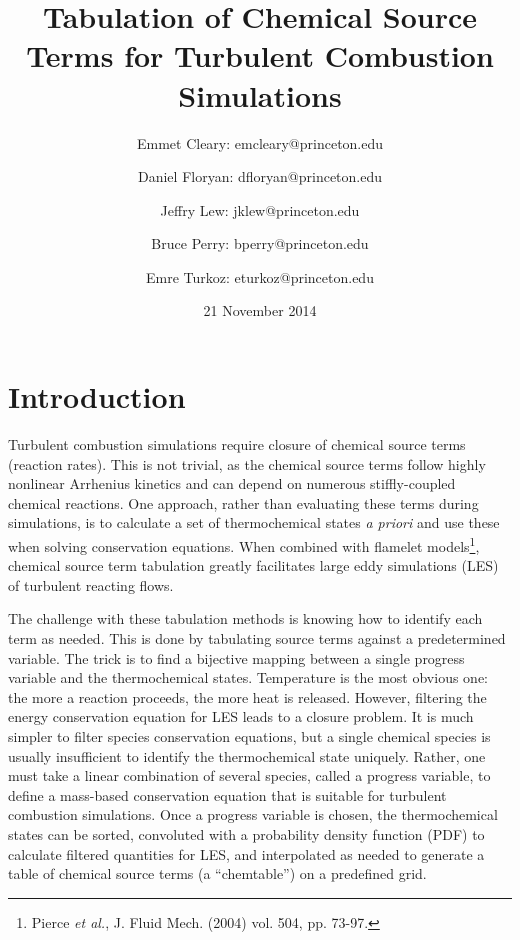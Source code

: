 \documentclass[11pt]{article}
\begin{document}
\title{\textbf{Tabulation of Chemical Source Terms for Turbulent
    Combustion Simulations}}

\author{Emmet Cleary: emcleary@princeton.edu \and Daniel Floryan:
  dfloryan@princeton.edu \and Jeffry Lew: jklew@princeton.edu \and
  Bruce Perry: bperry@princeton.edu \and Emre Turkoz:
  eturkoz@princeton.edu} 

\date{21 November 2014 }
\maketitle

\section{Introduction}
Turbulent combustion simulations require closure of chemical source terms (reaction rates). This is not trivial, as the chemical source terms follow highly nonlinear Arrhenius kinetics and can depend on numerous stiffly-coupled chemical reactions. One approach, rather than evaluating these terms during simulations, is to calculate a set of thermochemical states \textit{a priori} and use these when solving conservation equations. When combined with flamelet models\footnote{Pierce \textit{et al.}, J. Fluid Mech. (2004) vol. 504, pp. 73-97.}, chemical source term tabulation greatly facilitates large eddy simulations (LES) of turbulent reacting flows.

The challenge with these tabulation methods is knowing how to identify
each term as needed.  This is done by tabulating source terms against
a predetermined variable. The trick is to find a bijective mapping
between a single progress variable and the thermochemical
states. Temperature is the most obvious one: the more a reaction
proceeds, the more heat is released. However, filtering the energy
conservation equation for LES leads to a closure problem. It is much
simpler to filter species conservation equations, but a single
chemical species is usually insufficient to identify the
thermochemical state uniquely. Rather, one must take a linear
combination of several species, called a progress variable, to define
a mass-based conservation equation that is suitable for turbulent
combustion simulations. Once a progress variable is chosen, the
thermochemical states can be sorted, convoluted with a probability
density function (PDF) to calculate filtered quantities for LES, and
interpolated as needed to generate a table of chemical source terms (a
“chemtable”) on a predefined grid.
\end{document}
